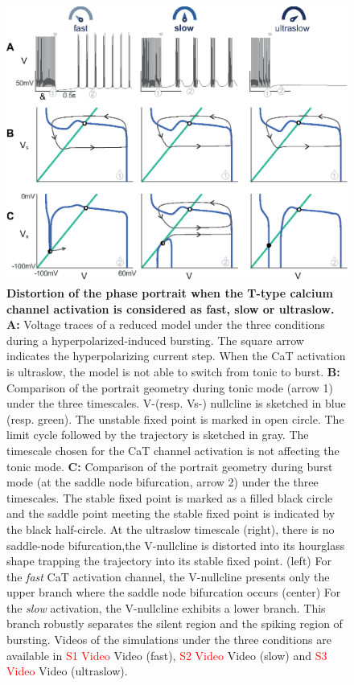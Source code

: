 \begin{figure}[h!]
\centering
\includegraphics[scale=1]{fig/Plos/Fig6}
\caption{ {\bf Distortion of the phase portrait when the T-type calcium channel activation is considered as fast, slow or ultraslow.  } \\
\textbf{A:} Voltage traces of a reduced model under the three conditions during a hyperpolarized-induced bursting. The square arrow indicates the hyperpolarizing current step. When the CaT activation is ultraslow, the model is not able to switch from tonic to burst.
\textbf{B:} Comparison of the portrait geometry during tonic mode (arrow 1) under the three timescales.  V-(resp. Vs-) nullcline is sketched in blue (resp. green).  The unstable fixed point is marked in open circle. The limit cycle followed by the trajectory is sketched in gray. The timescale chosen for the CaT channel activation is not affecting the tonic mode.
\textbf{C:} Comparison of the portrait geometry during burst mode (at the saddle node bifurcation, arrow 2) under the three timescales. The stable fixed point is marked as a filled black circle and the saddle point meeting the stable fixed point is indicated by the black half-circle.  At the ultraslow timescale (right), there is no saddle-node bifurcation,the V-nullcline is distorted into its hourglass shape trapping the trajectory into its stable fixed point.  (left) For the \textit{fast} CaT activation channel, the V-nullcline presents only the upper branch where the saddle node bifurcation occurs (center) For the \textit{slow} activation, the V-nullcline exhibits a lower branch. This branch robustly separates the silent region and the spiking region of bursting. Videos of the simulations under the three conditions are available in \textcolor{red}{S1 Video} Video (fast), \textcolor{red}{S2 Video} Video (slow) and \textcolor{red}{S3 Video} Video (ultraslow).}
\label{fig:6}
\end{figure}


